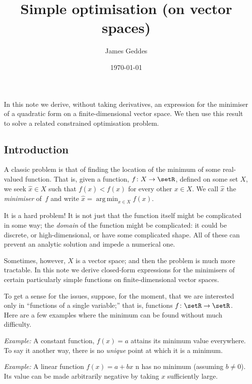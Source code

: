 \documentclass[10pt, a4paper]{article}
\title{Simple optimisation (on vector spaces)}
\author{James Geddes}
\date{\today}
\DeclareMathOperator*{\argmin}{arg\,min}
\newcommand{\eg}{\emph{Example:}}
\begin{document}
\maketitle

In this note we derive, without taking derivatives, an expression for
the minimiser of a quadratic form on a finite-dimensional vector
space. We then use this result to solve a related constrained
optimisation problem.

\subsection*{Introduction}
A classic problem is that of finding the location of the minimum of
some real-valued function. That is, given a function,
$f\colon X\to\setR$, defined on some set $X$, we seek $\hat{x}\in X$ such
that $f(\hat{x})<f(x)$ for every other $x\in X$. We call $\hat{x}$ the
\emph{minimiser} of~$f$ and write $\hat{x} = \argmin_{x\in X} f(x)$.

It is a hard problem! It is not just that the function itself might be
complicated in some way; the \emph{domain} of the function might be
complicated: it could be discrete, or high-dimensional, or have some
complicated shape. All of these can prevent an analytic solution and
impede a numerical one.

Sometimes, however, $X$ is a vector space; and then the problem is
much more tractable. In this note we derive closed-form expressions
for the minimisers of certain particularly simple functions on
finite-dimensional vector spaces.

To get a sense for the issues, suppose, for the moment, that we are
interested only in “functions of a single variable;” that is,
functions $f\colon \setR\to\setR$. Here are a few examples where the
minimum can be found without much difficulty.

\eg{} A constant function, $f(x) = a$ attains its minimum value
everywhere. To say it another way, there is no \emph{unique} point at
which it is a minimum.

\eg{} A linear function
$f(x) = a + bx$ n has no minimum (assuming $b\neq0$). Its value can be
made arbitrarily negative by taking $x$ sufficiently large.
\end{document}
